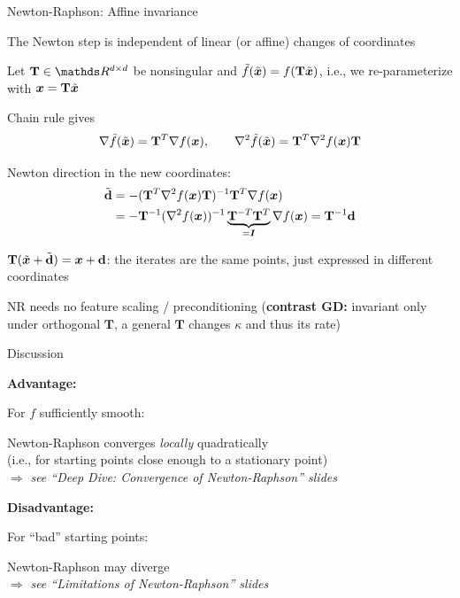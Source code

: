 \documentclass[11pt,compress,t,notes=noshow, xcolor=table]{beamer}
\begin{document}
\begin{framei}{Newton-Raphson: Affine invariance}
\item The Newton step is independent of linear (or affine) changes of coordinates
\item Let $\mathbf{T} \in \R^{d \times d}$ be nonsingular and $\tilde{f}(\tilde{\bm{x}}) = f(\mathbf{T}\tilde{\bm{x}})$, i.e., we
re-parameterize with $\bm{x} = \mathbf{T}\tilde{\bm{x}}$
\item Chain rule gives
$$
\nabla \tilde{f}(\tilde{\bm{x}}) = \mathbf{T}^T \nabla f(\bm{x}), \qquad
\nabla^2 \tilde{f}(\tilde{\bm{x}}) = \mathbf{T}^T \nabla^2 f(\bm{x}) \mathbf{T}
$$
\item Newton direction in the new coordinates:
\begin{align*}
\tilde{\mathbf{d}} &= -(\mathbf{T}^T \nabla^2 f(\bm{x}) \mathbf{T})^{-1} \mathbf{T}^T \nabla f(\bm{x}) \\
&= -\mathbf{T}^{-1} (\nabla^2 f(\bm{x}))^{-1} \underbrace{\mathbf{T}^{-T} \mathbf{T}^T}_{= \bm{I}} \nabla f(\bm{x})
= \mathbf{T}^{-1} \mathbf{d}
\end{align*}
\item[$\Rightarrow$] $\mathbf{T}(\tilde{\bm{x}} + \tilde{\mathbf{d}}) = \bm{x} + \mathbf{d}$: the iterates are the same points, just expressed in different coordinates
\item[$\Rightarrow$] NR needs no feature scaling / preconditioning
(\textbf{contrast GD:} invariant only under orthogonal $\mathbf{T}$, a general $\mathbf{T}$ changes $\kappa$ and thus its rate) 
\end{framei}


\begin{framei}[sep=L]{Discussion}
\item \textbf{Advantage:}
\item[] For $f$ sufficiently smooth:
\begin{framed}
\centering
Newton-Raphson converges \textit{locally} quadratically \\
(i.e., for starting points close enough to a stationary point) \\
$\Rightarrow$ \emph{see ``Deep Dive: Convergence of Newton-Raphson'' slides}
\end{framed}
\vfill
\item \textbf{Disadvantage:}
\item[] For \enquote{bad} starting points:
\begin{framed}
\centering
Newton-Raphson may diverge \\
$\Rightarrow$ \emph{see ``Limitations of Newton-Raphson'' slides}
\end{framed}
\end{framei}

\endlecture
\end{document}
